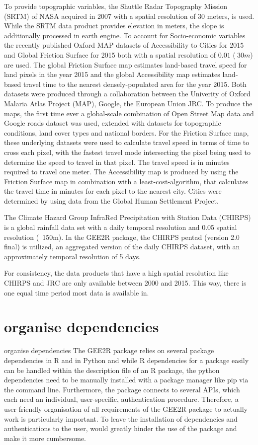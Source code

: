 \documentclass[11pt,twoside,a4paper,final]{report}
\begin{document}
To provide topographic variables, the Shuttle Radar Topography Mission (SRTM) of NASA acquired in 2007 with a spatial resolution of 30 meters, is used. While the SRTM data product provides elevation in meters, the slope is additionally processed in earth engine. To account for Socio-economic variables the recently published Oxford MAP datasets of Accessibility to Cities for 2015 and Global Friction Surface for 2015 both with a spatial resolution of $0.01$ ($~ 30m$) are used. The global Friction Surface map estimates land-based travel speed for land pixels in the year 2015 and the global Accessibility map estimates land-based travel time to the nearest densely-populated area for the year 2015. Both datasets were produced through a collaboration between the Univerity of Oxford Malaria Atlas Project (MAP), Google, the European Union JRC. To produce the maps, the first time ever a global-scale combination of Open Street Map data and Google roads dataset was used, extended with datasets for topographic conditions, land cover types and national borders.
For the Friction Surface map, these underlying datasets were used to calculate travel speed in terms of time to cross each pixel, with the fastest travel mode intersecting the pixel being used to determine the speed to travel in that pixel. The travel speed is in minutes required to travel one meter. The Accessibility map is produced by using the Friction Surface map in combination with a least-cost-algorithm, that calculates the travel time in minutes for each pixel to the nearest city. Cities were determined by using data from the Global Human Settlement Project.  


The Climate Hazard Group InfraRed Precipitation with Station Data (CHIRPS) is a global rainfall data set with a daily temporal resolution and 0.05 spatial resolution (~150m). In the GEE2R package, the CHIRPS pentad (version 2.0 final) is utilized, an aggregated version of the daily CHIRPS dataset, with an approximately temporal resolution of 5 days.

For consistency, the data products that have a high spatial resolution like CHIRPS and JRC are only available between 2000 and 2015. This way, there is one equal time period most data is available in.

\section{organise dependencies}

organise dependencies
The GEE2R package relies on several package dependencies in R and in Python and while R dependencies for a package easily can be handled within the description file of an R package, the python dependencies need to be manually installed with a package manager like pip via the command line. Furthermore, the package connects to several APIs, which each need an individual, user-specific, authentication procedure. Therefore, a user-friendly organisation of all requirements of the GEE2R package to actually work is particularly important. To leave the installation of dependencies and authentications to the user, would greatly hinder the use of the package and make it more cumbersome. 
\end{document}
